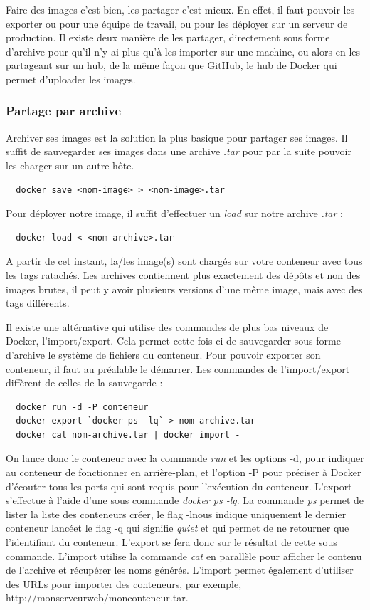 \documentclass[12pt,a4paper]{article}
\begin{document}
Faire des images c'est bien, les partager c'est mieux. En effet, il faut pouvoir les exporter ou pour une équipe de travail, ou pour les déployer sur un serveur de production. Il existe deux manière de les partager, directement sous forme d'archive pour qu'il n'y ai plus qu'à les importer sur une machine, ou alors en les partageant sur un hub, de la même façon que GitHub, le hub de Docker qui permet d'uploader les images.

\subsubsection{Partage par archive}

Archiver ses images est la solution la plus basique pour partager ses images. Il suffit de sauvegarder ses images dans une archive \textit{.tar} pour par la suite pouvoir les charger sur un autre hôte.
\begin{lstlisting}
  docker save <nom-image> > <nom-image>.tar
\end{lstlisting}

Pour déployer notre image, il suffit d'effectuer un \textit{load} sur notre archive \textit{.tar} :

\begin{lstlisting}
  docker load < <nom-archive>.tar
\end{lstlisting}

A partir de cet instant, la/les image(s) sont chargés sur votre conteneur avec tous les tags ratachés. Les archives contiennent plus exactement des dépôts et non des images brutes, il peut y avoir plusieurs versions d'une même image, mais avec des tags différents.

Il existe une altérnative qui utilise des commandes de plus bas niveaux de Docker, l'import/export. Cela permet cette fois-ci de sauvegarder sous forme d'archive le système de fichiers du conteneur. Pour pouvoir exporter son conteneur, il faut au préalable le démarrer. Les commandes de l'import/export diffèrent de celles de la sauvegarde :

\begin{lstlisting}
  docker run -d -P conteneur
  docker export `docker ps -lq` > nom-archive.tar
  docker cat nom-archive.tar | docker import -
\end{lstlisting}

On lance donc le conteneur avec la commande \textit{run} et les options -d, pour indiquer au conteneur de fonctionner en arrière-plan, et l'option -P pour préciser à Docker d'écouter tous les ports qui sont requis pour l'exécution du conteneur. L'export s'effectue à l'aide d'une sous commande \textit{docker ps -lq}. La commande \textit{ps} permet de lister la liste des conteneurs créer, le flag -lnous indique uniquement le dernier conteneur lancéet le flag -q qui signifie \textit{quiet} et qui permet de ne retourner que l'identifiant du conteneur. L'export se fera donc sur le résultat de cette sous commande. L'import utilise la commande \textit{cat} en parallèle pour afficher le contenu de l'archive et récupérer les noms générés. L'import permet également d'utiliser des URLs pour importer des conteneurs, par exemple, http://monserveurweb/monconteneur.tar.
\end{document}
